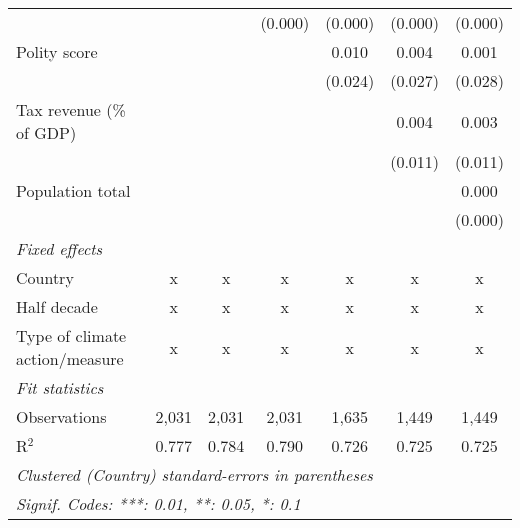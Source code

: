 \begin{tabular}{lcccccc}
                                                                                              &         &               & (0.000)        & (0.000)        & (0.000)       & (0.000)\\   
   Polity score                                                                               &         &               &                & 0.010          & 0.004         & 0.001\\   
                                                                                              &         &               &                & (0.024)        & (0.027)       & (0.028)\\   
   Tax revenue (\% of GDP)                                                                    &         &               &                &                & 0.004         & 0.003\\   
                                                                                              &         &               &                &                & (0.011)       & (0.011)\\   
   Population total                                                                           &         &               &                &                &               & 0.000\\   
                                                                                              &         &               &                &                &               & (0.000)\\   
   \emph{Fixed effects}\\
   Country                                                                                    & x       & x             & x              & x              & x             & x\\  
   Half decade                                                                                & x       & x             & x              & x              & x             & x\\  
   Type of climate action/measure                                                             & x       & x             & x              & x              & x             & x\\  
   \midrule \emph{Fit statistics}\\
   Observations                                                                               & 2,031   & 2,031         & 2,031          & 1,635          & 1,449         & 1,449\\  
   R$^2$                                                                                      & 0.777   & 0.784         & 0.790          & 0.726          & 0.725         & 0.725\\  
   \midrule
   \multicolumn{7}{l}{\emph{Clustered (Country) standard-errors in parentheses}}\\
   \multicolumn{7}{l}{\emph{Signif. Codes: ***: 0.01, **: 0.05, *: 0.1}}\\
\end{tabular}
\par\endgroup


